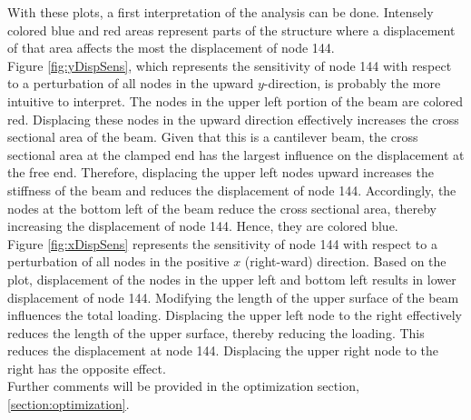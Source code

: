 With these plots, a first interpretation of the analysis can be done. Intensely colored blue and red areas represent parts of the structure where a displacement of that area affects the most the displacement of node 144. \\[3pt]
Figure \ref{fig:yDispSens}, which represents the sensitivity of node 144 with respect to a perturbation of all nodes in the upward $y$-direction, is probably the more intuitive to interpret. The nodes in the upper left portion of the beam are colored red. Displacing these nodes in the upward direction effectively increases the cross sectional area of the beam. Given that this is a cantilever beam, the cross sectional area at the clamped end has the largest influence on the displacement at the free end. Therefore, displacing the upper left nodes upward increases the stiffness of the beam and reduces the displacement of node 144. Accordingly, the nodes at the bottom left of the beam reduce the cross sectional area, thereby increasing the displacement of node 144. Hence, they are colored blue.\\[3pt]
Figure \ref{fig:xDispSens} represents the sensitivity of node 144 with respect to a perturbation of all nodes in the positive $x$ (right-ward) direction. Based on the plot, displacement of the nodes in the upper left and bottom left results in lower displacement of node 144. Modifying the length of the upper surface of the beam influences the total loading. Displacing the upper left node to the right effectively reduces the length of the upper surface, thereby reducing the loading. This reduces the displacement at node 144. Displacing the upper right node to the right has the opposite effect.\\[3pt]
Further comments will be provided in the optimization section, \ref{section:optimization}.

